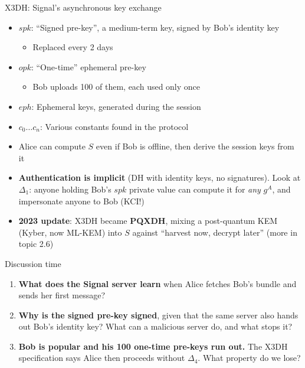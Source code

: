 \ifdefined\PRESENTATION\else\PassOptionsToClass{handout}{beamer}\fi\documentclass[aspectratio=169, lualatex]{beamer}
\begin{document}
\begin{frame}{X3DH: Signal's asynchronous key exchange}
	\begin{itemize}
		\item $spk$: ``Signed pre-key'', a medium-term key, signed by Bob's identity key
		      \begin{itemize}
			      \item Replaced every 2 days
		      \end{itemize}
		\item $opk$: ``One-time'' ephemeral pre-key
		      \begin{itemize}
			      \item Bob uploads 100 of them, each used only once
		      \end{itemize}
		\item $eph$: Ephemeral keys, generated during the session
		\item $c_0 \ldots c_n$: Various constants found in the protocol
		\item Alice can compute $S$ even if Bob is offline, then derive the session keys from it
		\item \textbf{Authentication is implicit} (DH with identity keys, no signatures). Look at $\Delta_1$: anyone holding Bob's $spk$ private value can compute it for \textit{any} $g^A$, and impersonate anyone to Bob (KCI!)
		\item \textbf{2023 update}: X3DH became \textbf{PQXDH}, mixing a post-quantum KEM (Kyber, now ML-KEM) into $S$ against ``harvest now, decrypt later'' (more in topic 2.6)
	\end{itemize}
\end{frame}

\begin{frame}{Discussion time}
	\begin{enumerate}
		\item \textbf{What does the Signal server learn} when Alice fetches Bob's bundle and sends her first message?
		\item \textbf{Why is the signed pre-key signed}, given that the same server also hands out Bob's identity key? What can a malicious server do, and what stops it?
		\item \textbf{Bob is popular and his 100 one-time pre-keys run out.} The X3DH specification says Alice then proceeds without $\Delta_4$. What property do we lose?
	\end{enumerate}
\end{frame}
\end{document}
